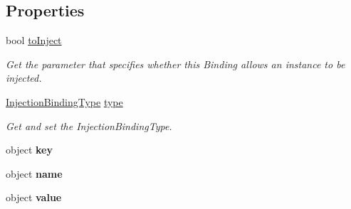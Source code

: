 \subsection*{Properties}
\begin{DoxyCompactItemize}
\item 
\hypertarget{interfacestrange_1_1extensions_1_1injector_1_1api_1_1_i_injection_binding_accffa605c37073081890281cc14d1c12}{bool \hyperlink{interfacestrange_1_1extensions_1_1injector_1_1api_1_1_i_injection_binding_accffa605c37073081890281cc14d1c12}{to\-Inject}}\label{interfacestrange_1_1extensions_1_1injector_1_1api_1_1_i_injection_binding_accffa605c37073081890281cc14d1c12}

\begin{DoxyCompactList}\small\item\em Get the parameter that specifies whether this Binding allows an instance to be injected. \end{DoxyCompactList}\item 
\hyperlink{namespacestrange_1_1extensions_1_1injector_1_1api_aaf5414484d7eccb5c502984bd70549ae}{Injection\-Binding\-Type} \hyperlink{interfacestrange_1_1extensions_1_1injector_1_1api_1_1_i_injection_binding_ab79532f96a6a17f831559143066fed78}{type}
\begin{DoxyCompactList}\small\item\em Get and set the Injection\-Binding\-Type. \end{DoxyCompactList}\item 
\hypertarget{interfacestrange_1_1extensions_1_1injector_1_1api_1_1_i_injection_binding_a44a79fe00fa37f91656098210db62d31}{object {\bfseries key}}\label{interfacestrange_1_1extensions_1_1injector_1_1api_1_1_i_injection_binding_a44a79fe00fa37f91656098210db62d31}

\item 
\hypertarget{interfacestrange_1_1extensions_1_1injector_1_1api_1_1_i_injection_binding_aa327532938e26bccb3d4c2ce8b5c15fb}{object {\bfseries name}}\label{interfacestrange_1_1extensions_1_1injector_1_1api_1_1_i_injection_binding_aa327532938e26bccb3d4c2ce8b5c15fb}

\item 
\hypertarget{interfacestrange_1_1extensions_1_1injector_1_1api_1_1_i_injection_binding_a1d64e731e4732f1acd876a76d1b1a33b}{object {\bfseries value}}\label{interfacestrange_1_1extensions_1_1injector_1_1api_1_1_i_injection_binding_a1d64e731e4732f1acd876a76d1b1a33b}


\end{DoxyCompactItemize}
